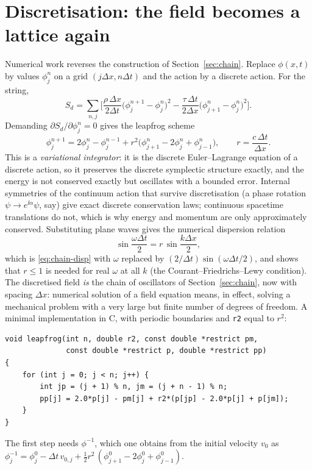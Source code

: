 \section{Discretisation: the field becomes a lattice again}
\label{sec:discrete}

Numerical work reverses the construction of Section~\ref{sec:chain}. Replace
$\phi(x,t)$ by values $\phi^n_j$ on a grid $(j\Delta x,n\Delta t)$ and the action by a
discrete action. For the string,
\begin{equation}
  S_d=\sum_{n,j}\Big[\frac{\rho\,\Delta x}{2\Delta t}\big(\phi^{n+1}_j-\phi^n_j\big)^2
  -\frac{\tau\,\Delta t}{2\Delta x}\big(\phi^n_{j+1}-\phi^n_j\big)^2\Big].
\end{equation}
Demanding $\partial S_d/\partial\phi^n_j=0$ gives the leapfrog scheme
\begin{equation}
  \phi^{n+1}_j=2\phi^n_j-\phi^{n-1}_j+r^2\big(\phi^n_{j+1}-2\phi^n_j+\phi^n_{j-1}\big),
  \qquad r=\frac{c\,\Delta t}{\Delta x}.
  \label{eq:leapfrog}
\end{equation}
This is a \emph{variational integrator}: it is the discrete Euler--Lagrange equation of a
discrete action, so it preserves the discrete symplectic structure exactly, and the
energy is not conserved exactly but oscillates with a bounded error. Internal
symmetries of the continuum action that survive discretisation (a phase rotation
$\psi\to e^{\ii\alpha}\psi$, say) give exact discrete conservation laws;
continuous spacetime translations do not, which is why energy and momentum are only
approximately conserved. Substituting plane waves gives the numerical
dispersion relation
\begin{equation}
  \sin\frac{\omega\Delta t}{2}=r\,\sin\frac{k\Delta x}{2},
\end{equation}
which is \eqref{eq:chain-disp} with $\omega$ replaced by $(2/\Delta t)\sin(\omega\Delta t/2)$, and shows that
$r\le1$ is needed for real $\omega$ at all $k$ (the Courant--Friedrichs--Lewy
condition). The discretised field \emph{is} the chain of oscillators of
Section~\ref{sec:chain}, now with spacing $\Delta x$: numerical solution of a field
equation means, in effect, solving a mechanical problem with a very large but finite number of degrees of
freedom. A minimal implementation in C, with periodic boundaries and
\texttt{r2} equal to $r^2$:
\begin{verbatim}
void leapfrog(int n, double r2, const double *restrict pm,
              const double *restrict p, double *restrict pp)
{
    for (int j = 0; j < n; j++) {
        int jp = (j + 1) % n, jm = (j + n - 1) % n;
        pp[j] = 2.0*p[j] - pm[j] + r2*(p[jp] - 2.0*p[j] + p[jm]);
    }
}
\end{verbatim}
The first step needs $\phi^{-1}$, which one obtains from the initial velocity
$v_0$ as $\phi^{-1}_j=\phi^0_j-\Delta t\,v_{0,j}+\tfrac12r^2\,(\phi^0_{j+1}-2\phi^0_j+\phi^0_{j-1})$.


